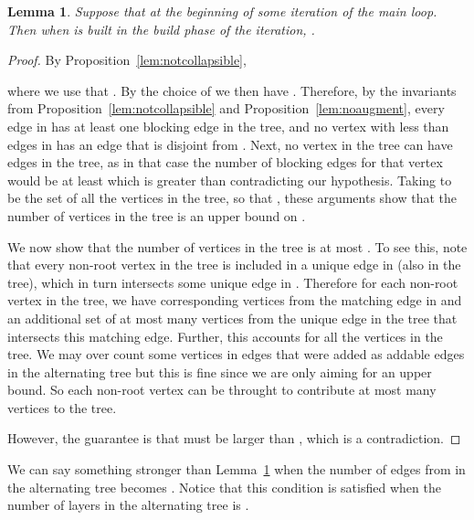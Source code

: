 \documentclass[11pt]{article}
\newtheorem{lemma}[theorem]{Lemma}
\theoremstyle{definition}
\theoremstyle{remark}
\begin{document}
\begin{lemma}\label{lem:addable0}
  Suppose that  at the beginning of some iteration of the main loop. Then when  is built in the build phase of the iteration, .
\end{lemma}
\begin{proof}
  By Proposition~\ref{lem:notcollapsible},
  
  where we use that . By the choice of
   we then have . Therefore, by the invariants from
  Proposition~\ref{lem:notcollapsible} and
  Proposition~\ref{lem:noaugment}, every edge in  has
  at least one blocking edge in the tree, and no  vertex with less
  than  edges in  has an edge that is disjoint from
  . Next, no  vertex in the
  tree can have  edges in the tree, as in
  that case the number of blocking edges for that vertex would be at
  least  which is greater than 
  contradicting our hypothesis. Taking  to be the set of all the
   vertices in the tree, so that , these
  arguments show that the number of  vertices in the tree is an
  upper bound on .

  We now show that the number of  vertices in the tree is at most
  . To see this, note that every non-root  vertex in
  the tree is included in a unique edge in  (also in the tree),
  which in turn intersects some unique edge in . Therefore for each non-root  vertex in the tree, we
  have  corresponding  vertices from the matching edge in
   and an additional set of at most  many  vertices from the
  unique edge in the tree that intersects this matching edge. Further,
  this accounts for all the  vertices in the tree. We may over
  count some  vertices in edges that were added as addable edges in
  the alternating tree but this is fine since we are only aiming for
  an upper bound. So each non-root  vertex can be throught to
  contribute at most  many  vertices to the tree.

  However, the guarantee is that  must be larger than
  , which is a contradiction.
\end{proof}

We can say something stronger than Lemma~\ref{lem:addable0} when the
number of edges from  in the alternating tree becomes . Notice that this condition is satisfied when the number of layers in the alternating tree is .
\end{document}

